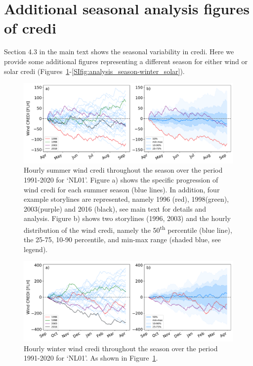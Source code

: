 \documentclass[12pt]{iopart}
\newcommand{\ts}[1]{\textsuperscript{#1}}
\newcommand{\credi}[0]{{\sc credi}}
\newcommand{\sdi}[0]{{\sc solar credi}}
\newcommand{\wdi}[0]{{\sc wind credi}}
\begin{document}

\clearpage
\section{Additional seasonal analysis figures of \credi}\label{app:seasonal}
Section 4.3 in the main text shows the seasonal variability in \credi.
Here we provide some additional figures representing a different season for either {\sc wind} or \sdi{} (Figures~\ref{SIfig:analysis_season-summer_wind}-\ref{SIfig:analysis_season-winter_solar}). 

\begin{figure}[h]
    \centering
    \includegraphics[width=\textwidth]{Figures_SI/WindCREDI_seasonal-summer}
    \caption{
    Hourly summer \wdi{} throughout the season over the period 1991-2020 for `NL01'.
    Figure a) shows the specific progression of \wdi{} for each summer season (blue lines).
    In addition, four example storylines are represented, namely 1996 (red), 1998(green), 2003(purple) and 2016 (black), see main text for details and analysis.
    Figure b) shows two storylines (1996, 2003) and the hourly distribution of the \wdi{}, namely the 50\ts{th} percentile (blue line), the 25-75, 10-90 percentile, and min-max range (shaded blue, see legend). 
    }
    \label{SIfig:analysis_season-summer_wind}
\end{figure}
\begin{figure}[b!]
    \centering
    \includegraphics[width=\textwidth]{Figures_SI/WindCREDI_seasonal-winter}
    \caption{
    Hourly winter \wdi{} throughout the season over the period 1991-2020 for `NL01'.
    As shown in Figure~\ref{SIfig:analysis_season-summer_wind}.
    }
    \label{SIfig:analysis_season-winter_wind}
\end{figure}
\end{document}
